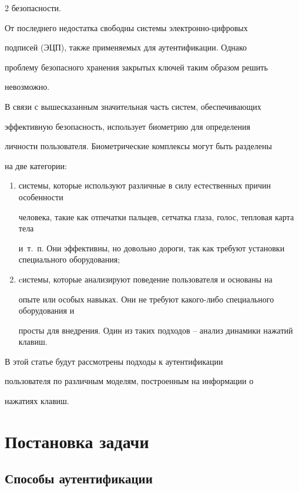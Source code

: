 \begin{multicols}{2}
безопасности.



От последнего недостатка свободны системы электронно-цифровых

подписей (ЭЦП), также применяемых для аутентификации. Однако

проб\-ле\-му безопасного хранения закрытых ключей таким образом решить

невозможно.



В связи с вышесказанным значительная часть систем, обеспечивающих

эффективную безопасность, использует биометрию для определения

личности пользователя. Биометрические комплексы могут быть разделены

на две категории:

\begin{enumerate}[(1)]

    \item системы, которые используют различные в силу естественных причин особенности 

    человека, такие как отпечатки пальцев, сетчатка глаза, голос, тепловая карта тела 

    и~т.~п. Они эффективны, но довольно дороги, так как требуют установки специального оборудования;

    \item cистемы, которые анализируют поведение пользователя и основаны на 

    опыте или особых навыках. Они не требуют какого-либо специального оборудования и 

    просты для внедрения. Один из таких подходов -- анализ динамики нажатий клавиш.

\end{enumerate}



В этой статье будут рассмотрены подходы к аутентификации

пользователя по различным моделям, построенным на информации о

нажатиях клавиш.



\section{Постановка задачи}



\subsection{Способы аутентификации}


\end{multicols}

